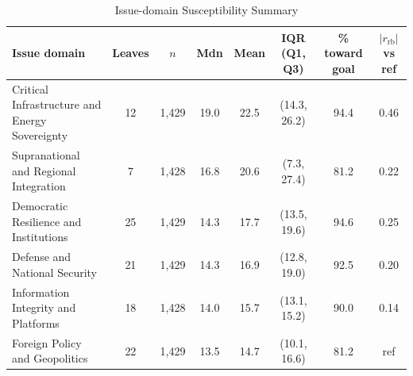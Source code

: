 \begin{table}[H]
\floatleft
\caption{Issue-domain Susceptibility Summary}
\label{tab:domains}
\vspace{2pt}
\begingroup\footnotesize
\begin{tabularx}{\linewidth}{@{}Y*{7}{c}@{}}
\toprule
Issue domain & Leaves & $n$ & Mdn & Mean & IQR (Q1, Q3) & \% toward goal & $|r_{\mathrm{rb}}|$ vs ref \\
\midrule
Critical Infrastructure and Energy Sovereignty & 12 & 1{,}429 & 19.0 & 22.5 & (14.3, 26.2) & 94.4 & 0.46 \\
Supranational and Regional Integration & 7 & 1{,}428 & 16.8 & 20.6 & (7.3, 27.4) & 81.2 & 0.22 \\
Democratic Resilience and Institutions & 25 & 1{,}429 & 14.3 & 17.7 & (13.5, 19.6) & 94.6 & 0.25 \\
Defense and National Security & 21 & 1{,}429 & 14.3 & 16.9 & (12.8, 19.0) & 92.5 & 0.20 \\
Information Integrity and Platforms & 18 & 1{,}428 & 14.0 & 15.7 & (13.1, 15.2) & 90.0 & 0.14 \\
Foreign Policy and Geopolitics & 22 & 1{,}429 & 13.5 & 14.7 & (10.1, 16.6) & 81.2 & ref \\
\bottomrule
\end{tabularx}
\endgroup
{}
\end{table}
